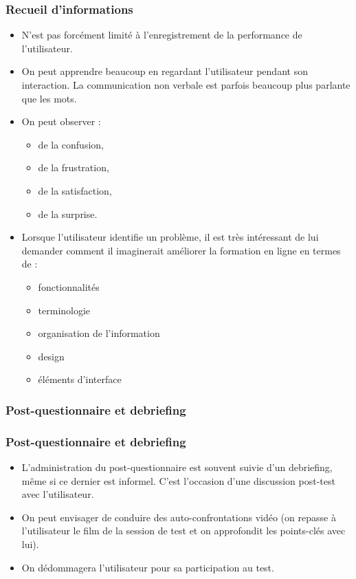 		\begin{frame}[allowframebreaks]
		\frametitle{Recueil d'informations}
					\begin {itemize}
				      \item N'est pas forcément limité à l'enregistrement de la performance de l'utilisateur. 
				      \item On peut apprendre beaucoup en regardant l'utilisateur pendant son interaction. La communication non verbale est parfois beaucoup plus parlante que les mots. 
				      \item On peut observer :
				      		\begin {itemize}
				      		\item de la confusion, 
				      		\item de la frustration, 
				      		\item de la satisfaction, 
				      		\item de la surprise. 
				      		\end{itemize}
				      	\item Lorsque l'utilisateur identifie un problème, il est très intéressant de lui demander comment il imaginerait améliorer la formation en ligne en termes de : 
				      	\begin {itemize}
				      		\item fonctionnalités
				      		\item terminologie
				      		\item organisation de l'information
				      		\item design
				      		\item éléments d'interface
				      		\end{itemize}
				   	\end{itemize}	
		\end{frame}    	 	

\subsubsection{Post-questionnaire et debriefing} 
		
		\begin{frame}[allowframebreaks]
		\frametitle{Post-questionnaire et debriefing}
					\begin {itemize}
				      \item L'administration du post-questionnaire est souvent suivie d'un debriefing, même si ce dernier est informel. C'est l'occasion d'une discussion post-test avec l'utilisateur.
					\item On peut envisager de conduire des auto-confrontations vidéo (on repasse à l'utilisateur le film de la session de test et on approfondit les points-clés avec lui).
					\item On dédommagera l'utilisateur pour sa participation au test. 
				   	\end{itemize}	
		\end{frame}   
		
